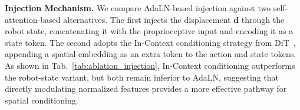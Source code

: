 \noindent\textbf{Injection Mechanism.}
We compare AdaLN-based injection against two self-attention-based alternatives. The first injects the displacement $\mathbf{d}$ through the robot state, concatenating it with the proprioceptive input and encoding it as a state token. The second adopts the In-Context conditioning strategy from DiT~\cite{DiT}, appending a spatial embedding as an extra token to the action and state tokens. As shown in Tab.~\ref{tab:ablation_injection}, In-Context conditioning outperforms the robot-state variant, but both remain inferior to AdaLN, suggesting that directly modulating normalized features provides a more effective pathway for spatial conditioning.
